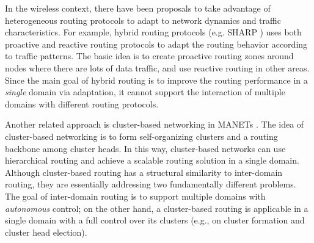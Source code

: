 In the wireless context, there have been proposals to take advantage of heterogeneous routing protocols to adapt to network dynamics and traffic characteristics. For example, hybrid routing protocols (e.g. SHARP \cite{haas03sharp}) uses both proactive and reactive routing protocols to adapt the routing behavior according to traffic patterns. The basic idea is to create proactive routing zones around nodes where there are lots of data traffic, and use reactive routing in other areas. 
Since the main goal of hybrid routing is to improve the routing performance in a {\em single} domain via adaptation, it cannot support the interaction of multiple domains with different routing protocols.

Another related approach is cluster-based networking in MANETs \cite{chen04clustering}. The idea of cluster-based networking is to form self-organizing clusters and a routing backbone among cluster heads. In this way, cluster-based networks can use hierarchical routing and achieve a scalable routing solution in a single domain.  Although cluster-based routing has a structural similarity to inter-domain routing, they are essentially addressing two fundamentally different problems. The goal of inter-domain routing is to support multiple domains with {\em autonomous} control; on the other hand, a cluster-based routing is applicable in a single domain with a full control over its clusters (e.g., on cluster formation and cluster head election). 

